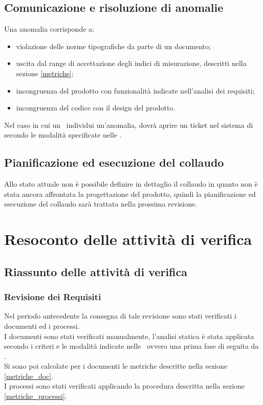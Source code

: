 \documentclass[12pt,a4paper]{article}
\begin{document}
\subsection{Comunicazione e risoluzione di anomalie}
Una anomalia corrisponde a:
\begin{itemize}
\item violazione delle norme tipografiche da parte di un documento;
\item uscita dal range di accettazione degli indici di misurazione, descritti nella sezione \ref{metriche};
\item incongruenza del prodotto con funzionalità indicate nell’analisi dei requisiti;
\item incongruenza del codice con il design del prodotto.
\end{itemize}
Nel caso in cui un \VR\ individui un’anomalia, dovrà aprire un ticket nel sistema di  secondo le modalità specificate nelle \NdP.
\subsection{Pianificazione ed esecuzione del collaudo}
Allo stato attuale non è possibile definire in dettaglio il collaudo in quanto non è stata ancora affrontata la progettazione del prodotto, quindi la pianificazione ed esecuzione del collaudo sarà trattata nella prossima revisione.

\newpage
\appendix
\section{Resoconto delle attività di verifica} \label{Resoconto delle attività di verifica}
\subsection{Riassunto delle attività di verifica} 
\subsubsection{Revisione dei Requisiti}
Nel periodo antecedente la consegna di tale revisione sono stati verificati i documenti ed i processi.\\
I documenti sono stati verificati manualmente, l’analisi statica è stata applicata secondo i criteri e le modalità indicate nelle \NdP\, ovvero una prima fase di  seguita da .\\
Si sono poi calcolate per i documenti le metriche descritte nella sezione \ref{metriche_doc}.\\
I processi sono stati verificati applicando la procedura descritta nella sezione \ref{metriche_processi}.
\end{document}
